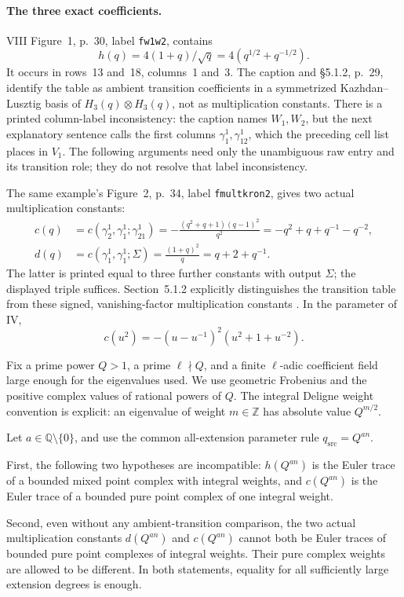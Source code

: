 \paragraph{The three exact coefficients.}
VIII Figure~1, p.~30, label \texttt{fw1w2}, contains
\begin{equation}\label{eq:jointTransitionCoefficient}
 h(q)=4(1+q)/\sqrt q=4(q^{1/2}+q^{-1/2}).
\end{equation}
It occurs in rows~13 and~18, columns~1 and~3.
The caption and \S5.1.2, p.~29, identify the table as
ambient transition coefficients in a symmetrized
Kazhdan--Lusztig basis of \(H_3(q)\otimes H_3(q)\),
not as multiplication constants.
There is a printed column-label inconsistency:
the caption names \(W_1,W_2\), but the next explanatory
sentence calls the first columns \(\gamma_1^1,\gamma_{12}^1\),
which the preceding cell list places in \(V_1\).
The following arguments need only the unambiguous raw
entry and its transition role; they do not resolve that
label inconsistency.

The same example's Figure~2, p.~34, label
\texttt{fmultkron2}, gives two actual multiplication constants:
\begin{align}
 c(q)&=c(\gamma_2^1,\gamma_1^1;\gamma_{21}^1)
   =-\frac{(q^2+q+1)(q-1)^2}{q^2}
   =-q^2+q+q^{-1}-q^{-2},
   \label{eq:jointNegativeCoefficient}\\
 d(q)&=c(\gamma_1^1,\gamma_1^1;\Sigma)
   =\frac{(1+q)^2}{q}
   =q+2+q^{-1}.
   \label{eq:jointPositiveCoefficient}
\end{align}
The latter is printed equal to three further constants
with output \(\Sigma\); the displayed triple suffices.
Section~5.1.2 explicitly distinguishes the transition
table from these signed, vanishing-factor multiplication
constants \cite{VIII}.
In the parameter of IV,
\[
                c(u^2)=-(u-u^{-1})^2(u^2+1+u^{-2}).
\]

Fix a prime power \(Q>1\), a prime \(\ell\nmid Q\),
and a finite \(\ell\)-adic coefficient field large enough
for the eigenvalues used. We use geometric Frobenius
and the positive complex values of rational powers of \(Q\).
The integral Deligne weight convention is explicit:
an eigenvalue of weight \(m\in\mathbb Z\) has absolute
value \(Q^{m/2}\).

\begin{finding}
\label{f:jointRawCoefficientNormalization}
Let \(a\in\mathbb Q\setminus\{0\}\), and use the common
all-extension parameter rule \(q_{\mathrm{src}}=Q^{an}\).

First, the following two hypotheses are incompatible:
\(h(Q^{an})\) is the Euler trace of a bounded mixed point
complex with integral weights, and \(c(Q^{an})\) is
the Euler trace of a bounded pure point complex of one
integral weight.

Second, even without any ambient-transition comparison,
the two actual multiplication constants
\(d(Q^{an})\) and \(c(Q^{an})\) cannot both be Euler
traces of bounded pure point complexes of integral weights.
Their pure complex weights are allowed to be different.
In both statements, equality for all sufficiently large
extension degrees is enough.
\end{finding}

